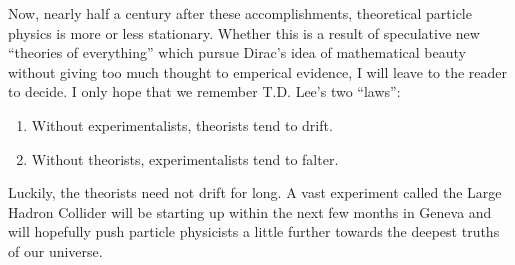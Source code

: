 \documentclass[12pt]{book}
\begin{document}
Now, nearly half a century after these accomplishments, theoretical particle physics is more or less stationary. Whether this is a result of speculative new ``theories of everything'' which pursue Dirac's idea of mathematical beauty without giving too much thought to emperical evidence, I will leave to the reader to decide. I only hope that we remember T.D. Lee's two ``laws'':

\begin{enumerate}
 \item Without experimentalists, theorists tend to drift.
 \item Without theorists, experimentalists tend to falter.
\end{enumerate}

Luckily, the theorists need not drift for long. A vast experiment called the Large Hadron Collider will be starting up within the next few months in Geneva and will hopefully push particle physicists a little further towards the deepest truths of our universe.

\end{document}
